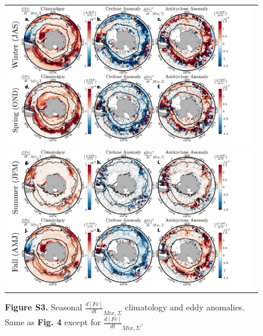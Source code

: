 \documentclass{article}
\begin{document}
\begin{figure}[!htbp]
 \begin{adjustwidth}{-1.2in}{-1.2in}
 \centering
  \begin{tabular}{c }
        \includegraphics[scale=.5]{FigS1a.pdf} \\
        \includegraphics[scale=.5]{FigS1b.pdf} \\
  \end{tabular}
 \end{adjustwidth}
\caption[S3. Seasonal $\frac{d[Fe]}{dt}_{Mix, \Sigma}$ climatology and eddy anomalies. ]
{\textbf{Figure S3.} Seasonal $\frac{d[Fe]}{dt}_{Mix, \Sigma}$ climatology and eddy anomalies. Same as \textbf{Fig. 4} except for $\frac{d[Fe]}{dt}_{Mix, \Sigma}$.
}
\label{fig:FigS3}
\end{figure}

\end{document}
